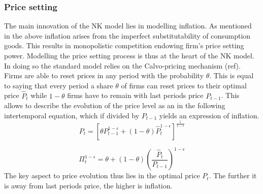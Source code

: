 \documentclass[12pt,a4paper,english]{article} %
\begin{document}
	\subsubsection{Price setting}
	The main innovation of the NK model lies in modelling inflation. As mentioned in the above inflation arises from the imperfect substitutability of consumption goods. This results in monopolistic competition endowing firm's price setting power. Modelling the price setting process is thus at the heart of the NK model. In doing so the standard model relies on the Calvo-pricing mechanism (ref). Firms are able to reset prices in any period with the probability $\theta$. This is equal to saying that every period a share $\theta$ of firms can reset prices to their optimal price $\hat{P}_t$ while $1-\theta$ firms have to remain with last periods price $P_{t-1}$. This allows to describe the evolution of the price level as an in the following intertemporal equation, which if divided by $P_{t-1}$ yields an expression of inflation.
	\begin{equation}
		P_t = 
		\left[
		\theta P_{t-1}^{1 - \epsilon} + (1 - \theta) \hat{P}_t^{1 - \epsilon}
		\right]^{\frac{1}{1 - \epsilon}}
	\end{equation}

	\begin{equation} \label{eq: inlfation}
		\Pi_t^{1-\epsilon} = \theta + (1 - \theta) \left(\frac{\hat{P}_t}{P_{t-1}} \right)^{1-\epsilon}
	\end{equation}
	The key aspect to price evolution thus lies in the optimal price $\hat{P_t}$. The further it is away from last periods price, the higher is inflation.
	
\end{document}
